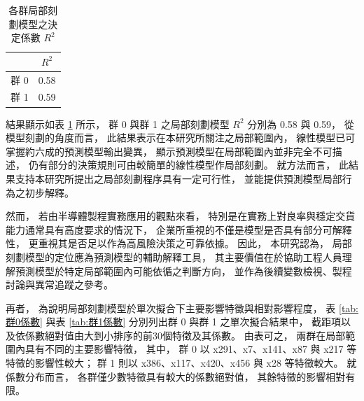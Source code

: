 \documentclass[12pt,a4paper,oneside]{book}
\begin{document}
	\begin{table}[H]
		\centering
		\caption{各群局部刻劃模型之決定係數 $R^2$ }
		\vspace{0.15cm}
		\label{tab:決定係數估計}
			\begin{tabular}{|c|c|}
				\hline
				 & $R^2$ \\
				\hline
				群 0 & 0.58 \\
				\hline
				群 1 & 0.59 \\
				\hline
			\end{tabular}
	\end{table}

	結果顯示如表 \ref{tab:決定係數估計} 所示，
	群 0 與群 1 之局部刻劃模型 $R^2$ 分別為 0.58 與 0.59，
	從模型刻劃的角度而言，
	此結果表示在本研究所關注之局部範圍內，
	線性模型已可掌握約六成的預測模型輸出變異，
	顯示預測模型在局部範圍內並非完全不可描述，
	仍有部分的決策規則可由較簡單的線性模型作局部刻劃。
	就方法而言，
	此結果支持本研究所提出之局部刻劃程序具有一定可行性，
	並能提供預測模型局部行為之初步解釋。
	
	然而，
	若由半導體製程實務應用的觀點來看，
	特別是在實務上對良率與穩定交貨能力通常具有高度要求的情況下，
	企業所重視的不僅是模型是否具有部分可解釋性，
	更重視其是否足以作為高風險決策之可靠依據。
	因此，
	本研究認為，
	局部刻劃模型的定位應為預測模型的輔助解釋工具，
	其主要價值在於協助工程人員理解預測模型於特定局部範圍內可能依循之判斷方向，
	並作為後續變數檢視、製程討論與異常追蹤之參考。

	再者，
	為說明局部刻劃模型於單次擬合下主要影響特徵與相對影響程度，
	表 \ref{tab:群0係數} 與表 \ref{tab:群1係數} 分別列出群 0 與群 1 之單次擬合結果中，
	截距項以及依係數絕對值由大到小排序的前30個特徵及其係數。
	由表可之，
	兩群在局部範圍內具有不同的主要影響特徵，
	其中，
	群 0 以 x291、x7、x141、x87 與 x217 等特徵的影響性較大；
	群 1 則以 x386、x117、x420、x456 與 x28 等特徵較大。
	就係數分布而言，
	各群僅少數特徵具有較大的係數絕對值，
	其餘特徵的影響相對有限。
	
\end{document}
